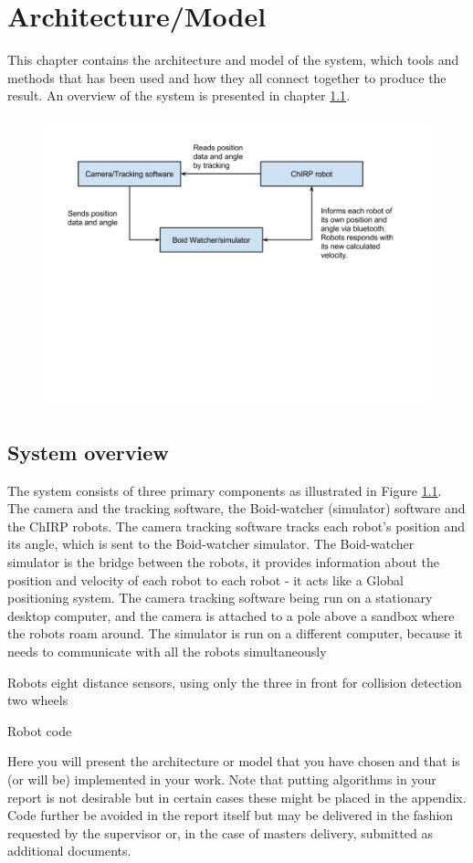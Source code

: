 \chapter{Architecture/Model}
\label{sec:architectureAndModel}
This chapter contains the architecture and model of the system, which tools and methods that has been used and how they all connect together to produce the result.
An overview of the system is presented in chapter \ref{sec:overview}. 
\begin{figure}[h]
\label{fig:overview}
\begin{center}
\includegraphics[width=0.8\linewidth]{figs/system_overview}
\end{center}
\end{figure}
\section{System overview}
\label{sec:overview}
The system consists of three primary components as illustrated in Figure \ref{fig:overview}. The camera and the tracking software, the Boid-watcher (simulator) software and the ChIRP robots.
The camera tracking software tracks each robot's position and its angle, which is sent to the Boid-watcher simulator. The Boid-watcher simulator is the bridge between the robots, it provides information about the position and velocity of each robot to each robot - it acts like a Global positioning system.
The camera tracking software being run on a stationary desktop computer, and the camera is attached to a pole above a sandbox where the robots roam around.
The simulator is run on a different computer, because it needs to communicate with all the robots simultaneously 

Robots
eight distance sensors, using only the three in front for collision detection
two wheels



Robot code


Here you will present the architecture or model that you have chosen and that is (or will be) implemented in your work. Note that putting algorithms in your report is not desirable but in certain cases these might be placed in the appendix. Code further be avoided in the report itself but may be delivered in the fashion requested by the supervisor or, in the case of masters delivery, submitted as additional documents. 